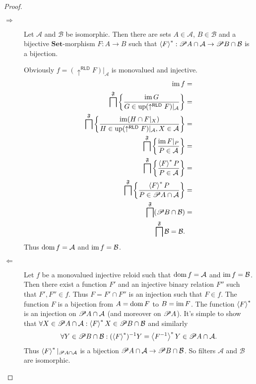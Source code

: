 \begin{proof}
~
\begin{description}
\item [{$\Rightarrow$}] Let $\mathcal{A}$ and $\mathcal{B}$ be isomorphic.
Then there are sets $A\in\mathcal{A}$, $B\in\mathcal{B}$ and a bijective
$\mathbf{Set}$-morphism $F:A\rightarrow B$ such that $\left\langle F\right\rangle ^{\ast}:\mathscr{P} A\cap\mathcal{A}\rightarrow\mathscr{P} B\cap\mathcal{B}$
is a bijection.


Obviously $f=(\uparrow^{\mathsf{RLD}}F)|_{\mathcal{A}}$ is monovalued
and injective.
\begin{align*}
\operatorname{im} f & =\\
\bigsqcap^{\mathfrak{F}}\left\{ \frac{\operatorname{im} G}{G\in\operatorname{up}(\uparrow^{\mathsf{RLD}}F)|_{\mathcal{A}}}\right\} & =\\
\bigsqcap^{\mathfrak{F}}\left\{ \frac{\operatorname{im}(H\cap F|_{X})}{H\in\operatorname{up}(\uparrow^{\mathsf{RLD}}F)|_{\mathcal{A}},X\in\mathcal{A}}\right\} & =\\
\bigsqcap^{\mathfrak{F}}\left\{ \frac{\operatorname{im} F|_{P}}{P\in\mathcal{A}}\right\} & =\\
\bigsqcap^{\mathfrak{F}}\left\{ \frac{\left\langle F\right\rangle ^{\ast}P}{P\in\mathcal{A}}\right\} & =\\
\bigsqcap^{\mathfrak{F}}\left\{ \frac{\left\langle F\right\rangle ^{\ast}P}{P\in\mathscr{P} A\cap\mathcal{A}}\right\} & =\\
\bigsqcap^{\mathfrak{F}}(\mathscr{P} B\cap\mathcal{B}) & =\\
\bigsqcap^{\mathfrak{F}}\mathcal{B}=\mathcal{B}.
\end{align*}
Thus $\operatorname{dom} f=\mathcal{A}$ and $\operatorname{im} f=\mathcal{B}$.

\item [{$\Leftarrow$}] Let $f$ be a monovalued injective reloid such
that $\operatorname{dom} f=\mathcal{A}$ and $\operatorname{im} f=\mathcal{B}$. Then there exist
a function $F'$ and an injective binary relation $F''$ such that
$F',F''\in f$. Thus $F=F'\cap F''$ is an injection such that $F\in f$.
The function $F$ is a bijection from $A=\operatorname{dom} F$ to $B=\operatorname{im} F$. The
function $\left\langle F\right\rangle ^{\ast}$ is an injection on $\mathscr{P} A\cap\mathcal{A}$
(and moreover on $\mathscr{P} A$). It's simple to show that $\forall X\in\mathscr{P} A\cap\mathcal{A}:\left\langle F\right\rangle ^{\ast}X\in\mathscr{P} B\cap\mathcal{B}$
and similarly 
\[
\forall Y\in\mathscr{P} B\cap\mathcal{B}:(\left\langle F\right\rangle ^{\ast})^{-1}Y=\left\langle F^{-1}\right\rangle ^{\ast}Y\in\mathscr{P} A\cap\mathcal{A}.
\]
Thus $\left\langle F\right\rangle ^{\ast}|_{\mathscr{P} A\cap\mathcal{A}}$ is a bijection $\mathscr{P} A\cap\mathcal{A}\rightarrow\mathscr{P} B\cap\mathcal{B}$.
So filters $\mathcal{A}$ and $\mathcal{B}$ are isomorphic.
\end{description}
\end{proof}
